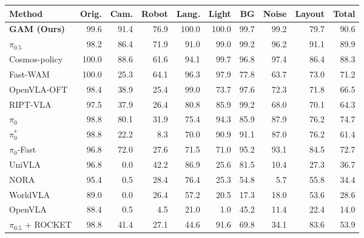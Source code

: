 \documentclass{llmxive}
\providecommand{\rkone}[1]{\cellcolor{rankone}#1}
\providecommand{\rktwo}[1]{\cellcolor{ranktwo}#1}
\providecommand{\rkthree}[1]{\cellcolor{rankthree}#1}
\begin{document}
\begin{table}[h]
\begin{minipage}[t]{0.49\textwidth}
{\begin{tabular}{@{}lrrrrrrrrr@{}}
\toprule
Method & Orig. & Cam. & Robot & Lang. & Light & BG & Noise & Layout & Total \\
\midrule
\textbf{GAM (Ours)} & \rktwo{99.6} & \rkone{91.4} & \rkone{76.9} & \rkone{100.0} & \rkone{100.0} & \rkone{99.7} & \rkone{99.2} & 79.7 & \rkone{90.6} \\
$\pi_{0.5}$ & 98.2 & \rkthree{86.4} & \rktwo{71.9} & 91.0 & \rkthree{99.0} & \rktwo{99.2} & \rkthree{96.2} & \rkone{91.1} & \rktwo{89.9} \\
Cosmos-policy & \rkone{100.0} & \rktwo{88.6} & 61.6 & 94.1 & \rktwo{99.7} & 96.8 & \rktwo{97.4} & \rktwo{86.4} & \rkthree{88.3} \\
Fast-WAM & \rkone{100.0} & 25.3 & \rkthree{64.1} & \rkthree{96.3} & 97.9 & 77.8 & 63.7 & 73.0 & 71.2 \\
OpenVLA-OFT & 98.4 & 38.9 & 25.4 & \rktwo{99.0} & 73.7 & \rkthree{97.6} & 72.3 & 71.8 & 66.5 \\
RIPT-VLA & 97.5 & 37.9 & 26.4 & 80.8 & 85.9 & \rktwo{99.2} & 68.0 & 70.1 & 64.3 \\
$\pi_0$ & \rkthree{98.8} & 80.1 & 31.9 & 75.4 & 94.3 & 85.9 & 87.9 & 76.2 & 74.7 \\
$\pi_0^{\ast}$ & \rkthree{98.8} & 22.2 & 8.3 & 70.0 & 90.9 & 91.1 & 87.0 & 76.2 & 61.4 \\
$\pi_0$-Fast & 96.8 & 72.0 & 27.6 & 71.5 & 71.0 & 95.2 & 93.1 & \rkthree{84.5} & 72.7 \\
UniVLA & 96.8 & 0.0 & 42.2 & 86.9 & 25.6 & 81.5 & 10.4 & 27.3 & 36.7 \\
NORA & 95.4 & 0.5 & 28.4 & 76.4 & 25.3 & 54.8 & 5.7 & 55.8 & 34.4 \\
WorldVLA & 89.0 & 0.0 & 26.4 & 57.2 & 20.5 & 17.3 & 18.0 & 53.6 & 28.6 \\
OpenVLA & 88.4 & 0.5 & 4.5 & 21.0 & 1.0 & 45.2 & 11.4 & 22.4 & 14.0 \\
$\pi_{0.5}$ + ROCKET & \rkthree{98.8} & 41.4 & 27.1 & 44.6 & 91.6 & 69.8 & 34.1 & 83.6 & 53.9 \\
\bottomrule
\end{tabular}%
}
\end{minipage}

\vspace{0.8em}


\end{table}
\end{document}
